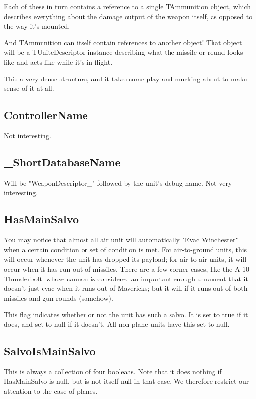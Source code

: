 \documentclass{article}
\begin{document}
Each of these in turn contains a reference to a single TAmmunition object, which describes everything about the damage output of the weapon itself, as opposed to the way it's mounted.

And TAmmunition can itself contain references to another object! That object will be a TUniteDescriptor instance describing what the missile or round looks like and acts like while it's in flight.

This a very dense structure, and it takes some play and mucking about to make sense of it at all.

\subsection{ControllerName}

Not interesting.

\subsection{\_ShortDatabaseName}

Will be "WeaponDescriptor\_" followed by the unit's debug name. Not very interesting.

\subsection{HasMainSalvo}

You may notice that almost all air unit will automatically "Evac Winchester" when a certain condition or set of condition is met. For air-to-ground units, this will occur whenever the unit has dropped its payload; for air-to-air units, it will occur when it has run out of missiles. There are a few corner cases, like the A-10 Thunderbolt, whose cannon is considered an important enough arnament that it doesn't just evac when it runs out of Mavericks; but it will if it runs out of both missiles and gun rounds (somehow).

This flag indicates whether or not the unit has such a salvo. It is set to true if it does, and set to null if it doesn't. All non-plane units have this set to null.

\subsection{SalvoIsMainSalvo}

This is always a collection of four booleans. Note that it does nothing if HasMainSalvo is null, but is not itself null in that case. We therefore restrict our attention to the case of planes.
\end{document}
